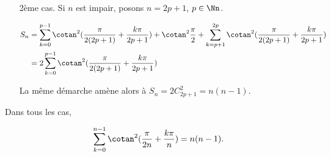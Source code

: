 {{\begin{itemize}
Les $p$ nombres deux à deux distincts $x_k$ sont racines de l'équation de degré $p$~:~$z^p-C_{2p}^{2}z^{p-1}+...+(-1)^p=0$ qui est de degré $p$. On en déduit que 

$$S_n=2\sum_{k=0}^{p-1}x_k=2C_{2p}^{2}=n(n-1).$$

\item[2ème cas.] Si $n$ est impair, posons $n=2p+1$, $p\in\Nn$.

\begin{align*}\ensuremath
S_n&=\sum_{k=0}^{p-1}\cotan^2(\frac{\pi}{2(2p+1)}+\frac{k\pi}{2p+1})+\cotan^2\frac{\pi}{2}+\sum_{k=p+1}^{2p}\cotan^2(\frac{\pi}{2(2p+1)}+\frac{k\pi}{2p+1})\\
 &=2\sum_{k=0}^{p-1}\cotan^2(\frac{\pi}{2(2p+1)}+\frac{k\pi}{2p+1})
\end{align*}

La même démarche amène alors à $S_n=2C_{2p+1}^{2}=n(n-1)$.
\end{itemize}

Dans tous les cas, 

$$\sum_{k=0}^{n-1}\cotan^2(\frac{\pi}{2n}+\frac{k\pi}{n})=n(n-1).$$
}
}
